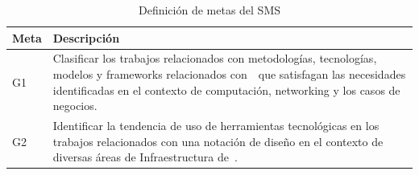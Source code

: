 \begin{table}[H]
	\centering
	\renewcommand{\arraystretch}{1.2} %
	\fontsize{9pt}{10pt}\selectfont %
	\begin{tabular}{|p{1.5cm}|p{12.5cm}|}  %
		\hline
		\textbf{Meta} & \textbf{Descripción}                                                                                                                                                                                                                                                                                                                                         \\ \hline
		G1            & Clasificar los trabajos relacionados con metodologías, tecnologías, modelos y frameworks relacionados con~\NDITI~que satisfagan las necesidades identificadas en el contexto de computación, networking y los casos de negocios. \\ \hline
		G2            & Identificar la tendencia de uso de herramientas tecnológicas en los trabajos relacionados con una notación de diseño en el contexto de diversas áreas de Infraestructura de~\TI.                                                                                                                                                     \\ \hline
	\end{tabular}
	\caption{Definición de metas del SMS}
	\label{tab:metas}
\end{table}


